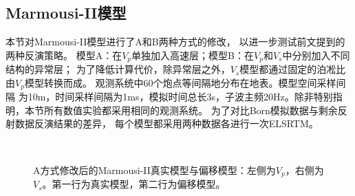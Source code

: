 \subsection{Marmousi-II模型}
本节对Marmousi-II模型进行了A和B两种方式的修改，
以进一步测试前文提到的两种反演策略。
模型A：在$V_p$单独加入高速层；模型B：在$V_p$和$V_s$中分别加入不同结构的异常层；
为了降低计算代价，除异常层之外，$V_s$模型都通过固定的泊凇比由$V_p$模型转换而成。
观测系统中60个炮点等间隔地分布在地表。模型空间采样间隔
为10m，时间采样间隔为1ms，模拟时间总长3s，子波主频20Hz。除非特别指明，本节所有数值实验都采用相同的观测系统。
为了对比Born模拟数据与剩余反射数据反演结果的差异，
每个模型都采用两种数据各进行一次ELSRTM。
\begin{figure}[!htb]
   \centering
   \\
   \caption{A方式修改后的Marmousi-II真实模型与偏移模型：左侧为$V_p$，右侧为$V_s$。第一行为真实模型，第二行为偏移模型。}
   \label{fig:TrueAndInitial_1}
\end{figure}
